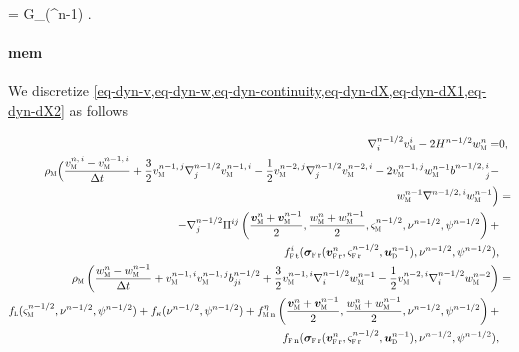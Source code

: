 \be
\label{eq_phi_1}
\rhof {}  = G_{\beta \alpha}(\budom^{n-1})         \pderr{ \phif   }{\beta }  \omr.
\ee\vspace{1cm}\\

\paragraph{\Acl{mem}}\label{sec_temp_discretization_mem_mem}


We discretize \cref{eq-dyn-v,eq-dyn-w,eq-dyn-continuity,eq-dyn-dX,eq-dyn-dX1,eq-dyn-dX2} as follows


\bw
\begin{align}
    \label{eq_mem_flu_disc_3}
    \nab^\nmhalf_i \vmem{i} - 2 H^\nmhalf \wmem^n                                                                              =                                                                                                                             & 0,                        \\
    \label{eq_mem_flu_disc_1}
    \rhom \Big(  \frac{\vmem{n,\, i} - \vmem{n-1,\, i}}{\deltat} +   \frac{3}{2}\vmem{n-1,\, j}  \nab^{\nmhalf}_j \vmem{n-1,\, i} -   \frac{1}{2}\vmem{n-2,\, j}  \nab^{\nmhalf}_j \vmem{n-2,\, i} - 2 \vmem{n-1,\, j} \wmem^{n-1} \fnij{b}{\nmhalf}{i}{j} - & \newlinenn
    \wmem^{n-1} \nab^{\nmhalf, \, i} \wmem^{n-1} \Big)                                                                                                                                                                                                       & =              \newlinenn
    - \nab^\nmhalf_j \Pi^{ij} \left( \frac{\bvmem{n} + \bvmem{n-1}}{2}, \frac{\wmem^n + \wmem^{n-1}}{2},\sigmam{\nmhalf},\nu^\nmhalf,\psi^\nmhalf \right)+ \newlinenn
    f_{\fluid\, \text{t}}^i({\bsigmastressr}(\bvfr{n}, \sigmafr{\nmhalf}, \budom^{n-1}), \nu^\nmhalf, \psi^\nmhalf) ,                                                                                                                                        &
    \\
    \label{eq_mem_flu_disc_2}
    \rhom \left( \frac{\wmem^n - \wmem^{n-1}}{\deltat} + \vmem{n-1,\, i} \vmem{n-1,\, j} b^\nmhalf_{ji} + \frac{3}{2} \vmem{n-1, \, i}  \nab^\nmhalf_i \wmem^{n-1}  - \frac{1}{2} \vmem{n-2, \, i}  \nab^\nmhalf_i \wmem^{n-2} \right)                       & =\newlinenn
    f_\lapl(\sigmam{\nmhalf}, \nu^\nmhalf,\psi^\nmhalf) + f_\kap(\nu^\nmhalf,\psi^\nmhalf)  + \fetamemn     \left( \frac{\bvmem{n} + \bvmem{n-1}}{2}, \frac{\wmem^n + \wmem^{n-1}}{2}, \nu^\nmhalf, \psi^\nmhalf\right) + \newlinenn
    \fflun ({\bsigmastressr}(\bvfr{n}, \sigmafr{\nmhalf}, \budom^{n-1}), \nu^\nmhalf, \psi^\nmhalf),                                                                                                                                                         &\end{align}
\ew


